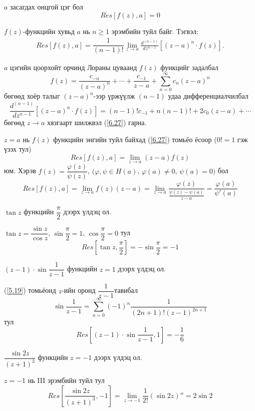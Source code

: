  \begin{cor}
 $a$ засагдах онцгой цэг бол
 $$Res[f(z),a]=0$$
 \end{cor}
 \begin{thm}
 $f(z)$-функцийн хувьд $a$ нь $n\geq 1$ эрэмбийн туйл байг. Тэгвэл:
 \begin{eqnarray} \label{6.27}
 Res [f(z),a]=\dfrac{1}{(n-1)!}\lim\limits_{z\rightarrow a}\frac{d^{(n-1)}}{dz^{n-1}}[(z-a)^n\cdot f(z)].
 \end{eqnarray}
 \end{thm}
 \begin{prf}
$a$ цэгийн цоорхойт орчинд Лораны цуваанд $f(z)$ функцийг задалбал
$$f(z)=\frac{c_{-n}}{(z-a)^n}+\cdots +\frac{c_{-1}}{z-a}+\sum\limits_{n=0}^\infty c_n(z-a)^n$$
бөгөөд хоёр талыг $(z-a)^n$-ээр үржүүлж $(n-1)$ удаа дифференциалчилбал
$$\frac{d^{(n-1)}}{dz^{n-1}}[(z-a)^n\cdot f(z)]=(n-1)!c_{-1}+n(n-1)!+2c_0(z-a)+\cdots$$
бөгөөд $z\rightarrow a$ хязгаарт шилжвэл (\ref{6.27}) гарна.

$z=a$ нь $f(z)$ функцийн энгийн туйл байхад (\ref{6.27}) томьёо ёсоор ($0!=1$  гэж үзэх тул)
$$Res [f(z),a]=\lim\limits_{z\rightarrow a}(z-a)f(z)$$
юм. Хэрэв $f(z)=\dfrac{\varphi (z)}{\psi(z)}$, $(\varphi, \psi\in H(a)$, $\varphi(a)\neq 0$, $\psi(a)=0)$ бол 
$$Res[f(z),a]=\lim\limits_{z\rightarrow a}f(z)(z-a)=\lim\limits_{z\rightarrow a}\frac{\varphi (z)}{\frac{\psi(z)-\psi (a)}{z-a}}=\frac{\varphi(a)}{\psi '(a)}$$ 
  \end{prf}
 \begin{exm}
 $\tan z$ функцийн $\dfrac{\pi}{2}$ дээрх үлдэц ол.
 \end{exm}
 \begin{sol}
 $\tan z=\dfrac{\sin z}{\cos z}$, $\sin\dfrac{\pi}{2}=1$, $\cos\dfrac{\pi}{2}=0$ тул $$Res \left[\tan z, \dfrac{\pi}{2}\right] =-\sin \frac{\pi}{2}=-1$$
 \end{sol}
 \begin{exm}
 $(z-1)\cdot \sin\dfrac{1}{z-1}$ функцийн $z=1$ дээрх үлдэц ол.
  \end{exm}
\begin{sol}
	(\ref{5.19}) томьёонд $z$-ийн оронд $\dfrac{1}{z-1}$тавибал
	$$\sin\frac{1}{z-1}=\sum\limits_{n=0}^\infty (-1)^n \frac{1}{(2n+1)!(z-1)^{2n+1}}$$ тул 
	$$Res\left[(z-1)\cdot \sin \frac{1}{z-1}, 1\right] =-\frac{1}{6}$$
\end{sol}
\begin{exm}
$\dfrac{\sin 2z}{(z+1)^3}$ функцийн $z=-1$ дээрх үлдэц ол.
\end{exm}
\begin{sol}
    $z=-1$ нь III эрэмбийн туйл тул 
    $$Res \left[\frac{\sin 2z}{(z+1)^3}, -1\right]=\lim\limits_{z\rightarrow -1}\frac{1}{2!}(\sin 2z)''=2\sin 2$$
\end{sol}
